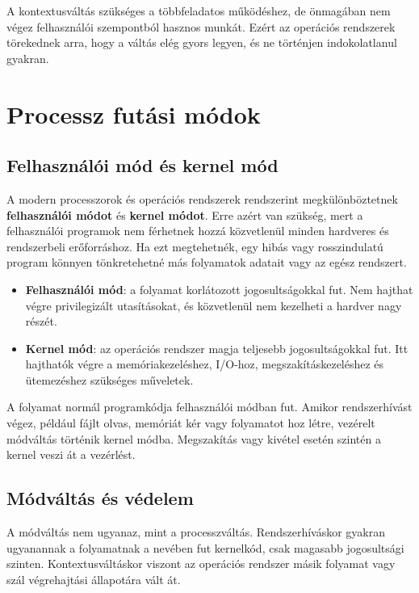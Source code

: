 

A kontextusváltás szükséges a többfeladatos működéshez, de önmagában nem végez felhasználói szempontból hasznos munkát. Ezért az operációs rendszerek törekednek arra, hogy a váltás elég gyors legyen, és ne történjen indokolatlanul gyakran.

\section{Processz futási módok}

\subsection{Felhasználói mód és kernel mód}

A modern processzorok és operációs rendszerek rendszerint megkülönböztetnek \textbf{felhasználói módot} és \textbf{kernel módot}. Erre azért van szükség, mert a felhasználói programok nem férhetnek hozzá közvetlenül minden hardveres és rendszerbeli erőforráshoz. Ha ezt megtehetnék, egy hibás vagy rosszindulatú program könnyen tönkretehetné más folyamatok adatait vagy az egész rendszert.

\begin{itemize}
  \item \textbf{Felhasználói mód}: a folyamat korlátozott jogosultságokkal fut. Nem hajthat végre privilegizált utasításokat, és közvetlenül nem kezelheti a hardver nagy részét.
  \item \textbf{Kernel mód}: az operációs rendszer magja teljesebb jogosultságokkal fut. Itt hajthatók végre a memóriakezeléshez, I/O-hoz, megszakításkezeléshez és ütemezéshez szükséges műveletek.
\end{itemize}

A folyamat normál programkódja felhasználói módban fut. Amikor rendszerhívást végez, például fájlt olvas, memóriát kér vagy folyamatot hoz létre, vezérelt módváltás történik kernel módba. Megszakítás vagy kivétel esetén szintén a kernel veszi át a vezérlést.

\subsection{Módváltás és védelem}

A módváltás nem ugyanaz, mint a processzváltás. Rendszerhíváskor gyakran ugyanannak a folyamatnak a nevében fut kernelkód, csak magasabb jogosultsági szinten. Kontextusváltáskor viszont az operációs rendszer másik folyamat vagy szál végrehajtási állapotára vált át.

